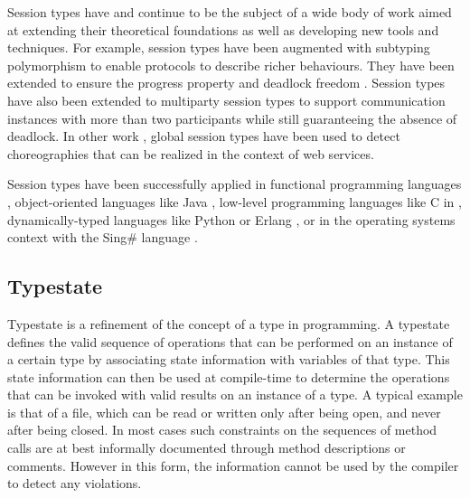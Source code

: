 


Session types have and continue to be the subject of a wide body of work aimed at extending their theoretical foundations as well as developing new tools and techniques. For example, session types have been augmented with subtyping polymorphism to enable protocols to describe richer behaviours\cite{gh05}.
They have been extended to ensure the progress property and deadlock freedom \cite{dyl08}. Session types have also been extended to multiparty session types to support communication instances with more than two participants while still guaranteeing the absence of deadlock\cite{mp08}. In other work \cite{ch07}, global session types have been used to detect choreographies that can be realized in the context of web services. 

Session types have been successfully applied in functional programming languages \cite{v06, bhargavan2009cryptographic}, object-oriented languages like Java \cite{hu2008session, gay2010modular}, low-level programming languages like C in \cite{ng2012multiparty}, dynamically-typed languages like Python\cite{neykova2013session} or Erlang \cite{erlang},  or in the operating systems context with the Sing\# language \cite{singularity}. 


\subsection{Typestate}


Typestate is a refinement of the concept of a type in programming. A typestate defines the valid sequence of operations that can be performed on an instance of a certain type by associating state information with variables of that type. This state information can then be used at compile-time to determine the operations that can be invoked with valid results on an instance of a type.
A typical example is that of a file, which can be read or written only after being open, and never after being closed. In most cases such constraints on the sequences of method calls are at best informally documented through method descriptions or comments. However in this form, the information cannot be used by the compiler to detect any violations. 

